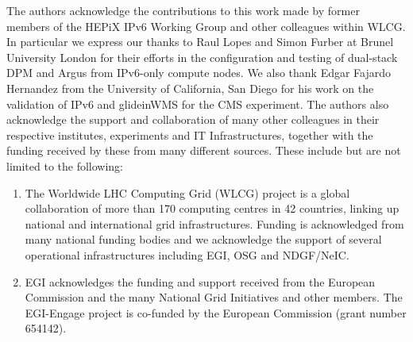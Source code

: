
The authors acknowledge the contributions to this work made by former members of the HEPiX IPv6 Working Group and other colleagues within WLCG. In particular we express our thanks to Raul Lopes and Simon Furber at Brunel University London for their efforts in the configuration and testing of dual-stack DPM and Argus from IPv6-only compute nodes.
We also thank Edgar Fajardo Hernandez from the University of California, San Diego for his work on the validation of IPv6 and glideinWMS for the CMS experiment. The authors also acknowledge the support and collaboration of many other colleagues in their respective institutes, experiments and IT Infrastructures, together with the funding received by these from many different sources. These include but are not limited to the following:
\begin{enumerate}

\item The Worldwide LHC Computing Grid (WLCG) project is a global collaboration of more than 170 computing centres in 42 countries, linking up national and international grid infrastructures. Funding is acknowledged from many national funding bodies and we acknowledge the support of several operational infrastructures including EGI, OSG and NDGF/NeIC.

\item EGI acknowledges the funding and support received from the European Commission and the many National Grid Initiatives and other members. The EGI-Engage project is co-funded by the European Commission (grant number 654142).

\end{enumerate}




